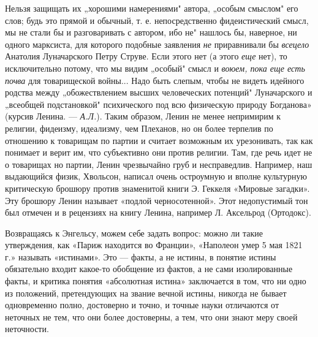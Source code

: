 Нельзя защищать их „хорошими намерениями" автора, „особым смыслом" его слов;
будь это прямой и обычный, т. е. непосредственно фидеистический смысл, мы не
стали бы и разговаривать с автором, ибо не" нашлось бы, наверное, ни одного
марксиста, для которого подобные заявления \emph{не} приравнивали бы
\emph{всецело} Анатолия Луначарского Петру Струве. Если этого нет (а этого
\emph{еще} нет), то исключительно потому, что мы видим „особый" смысл и
\emph{воюем, пока еще есть почва} для товарищеской войны... Надо быть слепым,
чтобы не видеть идейного родства между „обожествлением высших человеческих
потенций" Луначарского и „всеобщей подстановкой" психического под всю
физическую природу Богданова» (курсив Ленина. --- \emph{А.Л.}). Таким образом,
Ленин не менее непримирим к религии, фидеизму, идеализму, чем Плеханов, но он
более терпелив по отношению к товарищам по партии и считает возможным их
урезонивать, так как понимает и верит им, что субъективно они против религии.
Там, где речь идет не о товарищах но партии, Ленин чрезвычайно груб и
несправедлив. Например, наш выдающийся физик, Хвольсон, написал очень
остроумную и вполне культурную критическую брошюру против знаменитой книги Э.
Геккеля «Мировые загадки». Эту брошюру Ленин называет «подлой черносотенной».
Этот недопустимый тон был отмечен и в рецензиях на книгу Ленина, например Л.
Аксельрод (Ортодокс).

Возвращаясь к Энгельсу, можем себе задать вопрос: можно ли такие утверждения,
как «Париж находится во Франции», «Наполеон умер 5 мая 1821 г.» называть
«истинами». Это --- факты, а не истины, в понятие истины обязательно входит
какое-то обобщение из фактов, а не сами изолированные факты, и критика понятия
«абсолютная истина» заключается в том, что ни одно из положений, претендующих
на звание вечной истины, никогда не бывает одновременно полно, достоверно и
точно, и точные науки отличаются от неточных не тем, что они более достоверны,
а тем, что они знают меру своей неточности.

